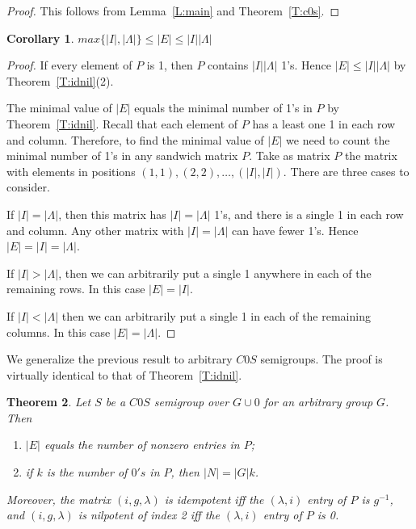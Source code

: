 \documentclass[12pt]{amsart}
\theoremstyle{plain}
\newtheorem{theorem}{Theorem}[section]
\newtheorem{corollary}[theorem]{Corollary}
\theoremstyle{definition}
\begin{document}
\begin {proof}
This follows from Lemma~\ref{L:main} and Theorem~\ref{T:c0s}.
\end {proof}




\begin {corollary}
$ max \{\vert I \vert,  \vert \Lambda \vert \} \leq \vert E \vert \leq \vert I \vert \vert \Lambda \vert$
\end {corollary}

\begin {proof}
If every element of $P$ is 1, then $P$ contains $\vert I\vert \vert \Lambda \vert$ 1's. Hence $\vert E \vert \leq \vert I \vert \vert \Lambda \vert$ by Theorem~\ref{T:idnil}(2). 

The minimal value of $\vert E \vert$ equals the minimal number of 1's in $P$ by Theorem~\ref{T:idnil}. Recall that each element of $P$ has a least one 1 in each row and column. Therefore, to find the minimal value of $\vert E\vert $ we need to count the minimal number of 1's in any sandwich matrix $P$. Take as matrix $P$ the matrix with elements in positions $(1, 1), (2, 2), \ldots, (\vert I \vert, \vert I \vert)$. There are three cases to consider. 

If $\vert I \vert = \vert \Lambda \vert$, then this matrix has $\vert I \vert = \vert \Lambda \vert $ 1's, and there is a single 1 in each row and column. Any other matrix with $\vert I \vert = \vert \Lambda \vert $ can have fewer 1's. Hence $\vert E \vert = \vert I \vert =\vert \Lambda \vert$. 

If $\vert I \vert > \vert \Lambda\vert$, then we can arbitrarily put a single 1 anywhere in each of the remaining rows. In this case $\vert E \vert = \vert I \vert$. 

If $\vert I \vert < \vert \Lambda \vert$ then we can arbitrarily put a single 1 in each of the remaining columns. In this case $\vert E \vert = \vert \Lambda \vert$. 
\end {proof}

We generalize the previous result to arbitrary $C0S$ semigroups. The proof is virtually identical to that of Theorem~\ref{T:idnil}. 

\begin {theorem}
\emph {Let $S$ be a $C0S$ semigroup over $G \cup 0$ for an arbitrary group $G$. Then}
\begin {enumerate}
\item \emph {$\vert E \vert$ equals the number of nonzero entries in $P$;}
\item \emph {if $k$ is the number of $0's$ in $P$, then $\vert N \vert = \vert G \vert k$.}
\end {enumerate}
\emph {Moreover, the matrix $(i, g, \lambda)$ is idempotent iff the $(\lambda, i)$ entry of $P$ is $g^{-1}$, and $(i, g, \lambda)$ is nilpotent of index 2 iff the $(\lambda, i)$ entry of $P$ is 0. }
\end {theorem}
\end{document}
